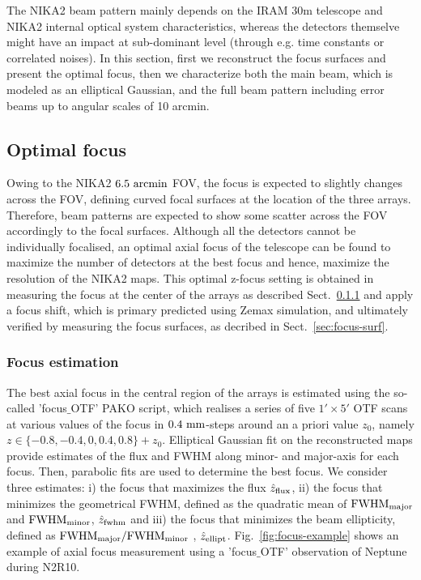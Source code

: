 

The NIKA2 beam pattern mainly depends on the IRAM 30m telescope and NIKA2 internal optical system characteristics, whereas the detectors themselve might have an impact at sub-dominant level (through e.g. time constants or correlated noises). In this section, first we reconstruct the focus surfaces and present the optimal focus, then we characterize both the main beam, which is modeled as an elliptical Gaussian, and the full beam pattern including error beams up to angular scales of 10 arcmin. 

\subsection{Optimal focus}
\label{sec:focus}

Owing to the NIKA2 $6.5~\rm{arcmin}$ FOV, the focus is expected to
slightly changes across the FOV, defining curved focal surfaces at the
location of the three arrays. Therefore, beam patterns are expected to
show some scatter across the FOV accordingly to the focal
surfaces. Although all the detectors cannot be individually focalised,
an optimal axial focus of the telescope can be found to maximize the
number of detectors at the best focus and hence, maximize the
resolution of the NIKA2 maps. This optimal z-focus setting is obtained
in measuring the focus at the center of the arrays as described
Sect.~\ref{sec:focus-meas} and apply a focus shift, which is primary
predicted using Zemax simulation, and ultimately verified by measuring
the focus surfaces, as decribed in Sect.~\ref{sec:focus-surf}.


\subsubsection{Focus estimation}
\label{sec:focus-meas}

The best axial focus in the central region of the arrays is estimated
using the so-called 'focus$\_$OTF' PAKO script, which realises a
series of five $1' \times 5'$ OTF scans at various values of
the focus in $0.4~\rm{mm}$-steps around an a priori value $z_0$,
namely $z \in \{-0.8, -0.4, 0, 0.4, 0.8\} + z_0$. Elliptical Gaussian
fit on the reconstructed maps provide estimates of the flux and FWHM
along minor- and major-axis for each focus. Then, parabolic fits are
used to determine the best focus. We consider three estimates: i) the
focus that maximizes the flux $\hat z_{\rm{flux}}$, ii) the focus that
minimizes the geometrical FWHM, defined as the quadratic mean of
$\rm{FWHM}_{\rm{major}}$ and $\rm{FWHM}_{\rm{minor}}$, $\hat
z_{\rm{fwhm}}$ and iii) the focus that minimizes the beam ellipticity,
defined as $\rm{FWHM}_{\rm{major}}/\rm{FWHM}_{\rm{minor}}$ , $\hat
z_{\rm{ellipt}}$. Fig.~\ref{fig:focus-example} shows an example of
axial focus measurement using a 'focus$\_$OTF' observation of Neptune
during N2R10.

